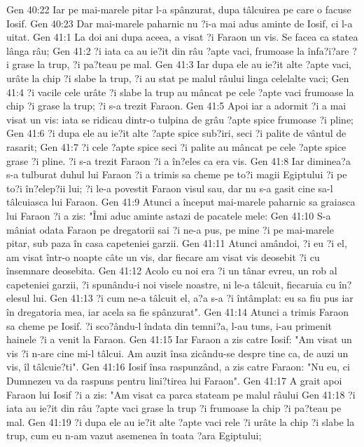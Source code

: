 Gen 40:22  Iar pe mai-marele pitar l-a spânzurat, dupa tâlcuirea pe care o facuse Iosif.
Gen 40:23  Dar mai-marele paharnic nu ?i-a mai adus aminte de Iosif, ci l-a uitat.
Gen 41:1  La doi ani dupa aceea, a visat ?i Faraon un vis. Se facea ca statea lânga râu;
Gen 41:2  ?i iata ca au ie?it din râu ?apte vaci, frumoase la înfa?i?are ?i grase la trup, ?i pa?teau pe mal.
Gen 41:3  Iar dupa ele au ie?it alte ?apte vaci, urâte la chip ?i slabe la trup, ?i au stat pe malul râului linga celelalte vaci;
Gen 41:4  ?i vacile cele urâte ?i slabe la trup au mâncat pe cele ?apte vaci frumoase la chip ?i grase la trup; ?i s-a trezit Faraon.
Gen 41:5  Apoi iar a adormit ?i a mai visat un vis: iata se ridicau dintr-o tulpina de grâu ?apte spice frumoase ?i pline;
Gen 41:6  ?i dupa ele au ie?it alte ?apte spice sub?iri, seci ?i palite de vântul de rasarit;
Gen 41:7  ?i cele ?apte spice seci ?i palite au mâncat pe cele ?apte spice grase ?i pline. ?i s-a trezit Faraon ?i a în?eles ca era vis.
Gen 41:8  Iar diminea?a s-a tulburat duhul lui Faraon ?i a trimis sa cheme pe to?i magii Egiptului ?i pe to?i în?elep?ii lui; ?i le-a povestit Faraon visul sau, dar nu s-a gasit cine sa-l tâlcuiasca lui Faraon.
Gen 41:9  Atunci a început mai-marele paharnic sa graiasca lui Faraon ?i a zis: "Îmi aduc aminte astazi de pacatele mele:
Gen 41:10  S-a mâniat odata Faraon pe dregatorii sai ?i ne-a pus, pe mine ?i pe mai-marele pitar, sub paza în casa capeteniei garzii.
Gen 41:11  Atunci amândoi, ?i eu ?i el, am visat într-o noapte câte un vis, dar fiecare am visat vis deosebit ?i cu însemnare deosebita.
Gen 41:12  Acolo cu noi era ?i un tânar evreu, un rob al capeteniei garzii, ?i spunându-i noi visele noastre, ni le-a tâlcuit, fiecaruia cu în?elesul lui.
Gen 41:13  ?i cum ne-a tâlcuit el, a?a s-a ?i întâmplat: eu sa fiu pus iar în dregatoria mea, iar acela sa fie spânzurat".
Gen 41:14  Atunci a trimis Faraon sa cheme pe Iosif. ?i sco?ându-l îndata din temni?a, l-au tuns, i-au primenit hainele ?i a venit la Faraon.
Gen 41:15  Iar Faraon a zis catre Iosif: "Am visat un vis ?i n-are cine mi-l tâlcui. Am auzit însa zicându-se despre tine ca, de auzi un vis, îl tâlcuie?ti".
Gen 41:16  Iosif însa raspunzând, a zis catre Faraon: "Nu eu, ci Dumnezeu va da raspuns pentru lini?tirea lui Faraon".
Gen 41:17  A grait apoi Faraon lui Iosif ?i a zis: "Am visat ca parca stateam pe malul râului
Gen 41:18  ?i iata au ie?it din râu ?apte vaci grase la trup ?i frumoase la chip ?i pa?teau pe mal.
Gen 41:19  ?i dupa ele au ie?it alte ?apte vaci rele ?i urâte la chip ?i slabe la trup, cum eu n-am vazut asemenea în toata ?ara Egiptului;
